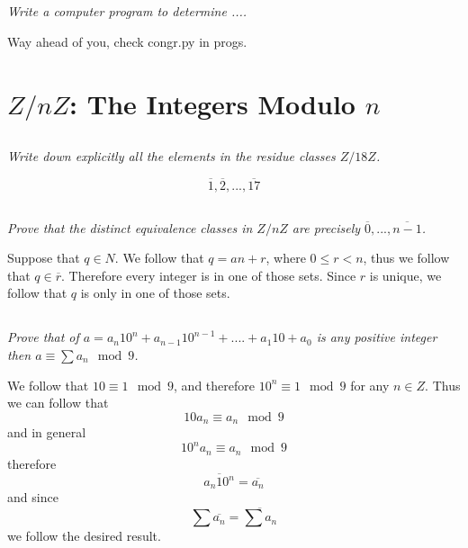 \documentclass[11pt,oneside,titlepage]{book}
\begin{document}
\subsection{}

\textit{Write a computer program to determine ....}

Way ahead of you, check congr.py in progs.






\section{$Z/n Z$: The Integers Modulo $n$}

\subsection{}
\textit{Write down explicitly all the elements in the residue classes $Z/18Z$.}

$$\overline{1}, \overline{2}, ... , \overline{17}$$

\subsection{}

\textit{Prove that the distinct equivalence classes in $Z/nZ$ are precisely
  $\overline{0}, ..., \overline{n - 1}$.}

Suppose that $q \in N$. We follow that $q = an + r$, where $0 \leq r < n$, thus we follow that
$q \in \overline{r}$. Therefore every integer is in one of those sets. Since $r$ is
unique, we follow that $q$ is only in one of those sets.

\subsection{}

\textit{Prove that of $a = a_n 10^n + a_{n - 1}10 ^{n - 1} + .... + a_1 10 + a_0$ is any positive
  integer then $a \equiv \sum{a_n} \mod 9$.}

We follow that $10 \equiv 1 \mod 9$, and therefore $10^n \equiv 1 \mod 9$ for any $n \in Z$.
Thus we can follow that
$$10 a_n \equiv a_n \mod 9$$
and in general
$$10^n a_n \equiv a_n \mod 9$$
therefore
$$\overline{a_n 10^n} = \overline{a_n}$$
and since
$$\sum {\overline{a_n}} = \overline{\sum a_n}$$
we follow the desired result.
\end{document}
